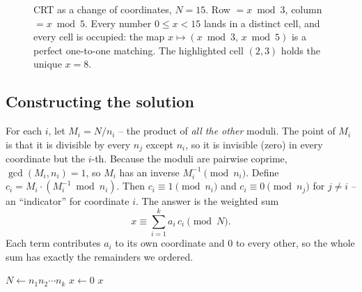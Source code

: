 \begin{figure}[H]
\centering
{}
\caption{CRT as a change of coordinates, $N=15$. Row $=x\bmod 3$, column $=x
\bmod 5$. Every number $0\le x<15$ lands in a distinct cell, and every cell is
occupied: the map $x \mapsto (x\bmod 3,\,x\bmod 5)$ is a perfect one-to-one matching. The
highlighted cell $(2,3)$ holds the unique $x=8$.}
\label{ch30:fig-crt}
\end{figure}

\subsection{Constructing the solution}

For each $i$, let
$M_i = N / n_i$ -- the product of \emph{all the other} moduli. The point of
$M_i$ is that it is divisible by every $n_j$ except $n_i$, so it is invisible
(zero) in every coordinate but the $i$-th. Because the moduli are pairwise
coprime, $\gcd(M_i, n_i) = 1$, so $M_i$ has an inverse $M_i^{-1} \pmod{n_i}$.
Define $c_i = M_i \cdot (M_i^{-1} \bmod n_i)$. Then $c_i \equiv 1 \pmod{n_i}$ and
$c_i \equiv 0 \pmod{n_j}$ for $j \neq i$ -- an ``indicator'' for
coordinate $i$. The answer is the weighted sum
\[
  x \equiv \sum_{i=1}^{k} a_i\, c_i \pmod N .
\]
Each term contributes $a_i$ to its own coordinate and $0$ to every other, so the
whole sum has exactly the remainders we ordered.

\begin{algorithm}[H]
\caption{\textsc{CRT}$(a_1,\dots,a_k;\, n_1,\dots,n_k)$}
\label{ch30:alg-crt}
\KwOut{The unique $x \in [0,N)$ solving all congruences, $N = \prod n_i$.}
$N \leftarrow n_1 n_2 \cdots n_k$\;
$x \leftarrow 0$\;
\Return $x$\;
\end{algorithm}

